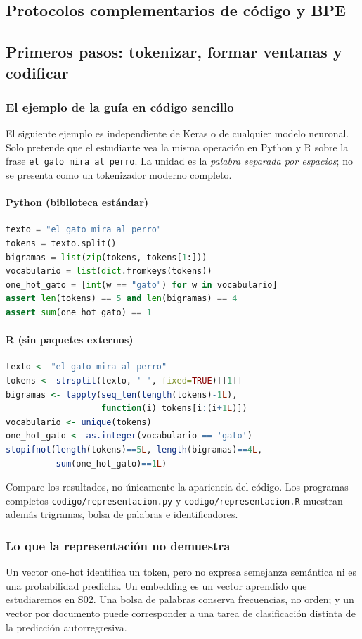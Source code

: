 \subsection{Protocolos complementarios de código y BPE}

\subsection{Primeros pasos: tokenizar, formar ventanas y codificar}
\subsubsection{El ejemplo de la guía en código sencillo}
El siguiente ejemplo es independiente de Keras o de cualquier modelo neuronal. Solo pretende que el estudiante vea la misma operación en Python y R sobre la frase \texttt{el gato mira al perro}. La unidad es la \emph{palabra separada por espacios}; no se presenta como un tokenizador moderno completo.
\paragraph{Python (biblioteca estándar)}
\begin{lstlisting}[language=Python]
texto = "el gato mira al perro"
tokens = texto.split()
bigramas = list(zip(tokens, tokens[1:]))
vocabulario = list(dict.fromkeys(tokens))
one_hot_gato = [int(w == "gato") for w in vocabulario]
assert len(tokens) == 5 and len(bigramas) == 4
assert sum(one_hot_gato) == 1
\end{lstlisting}
\paragraph{R (sin paquetes externos)}
\begin{lstlisting}[language=R]
texto <- "el gato mira al perro"
tokens <- strsplit(texto, ' ', fixed=TRUE)[[1]]
bigramas <- lapply(seq_len(length(tokens)-1L),
                   function(i) tokens[i:(i+1L)])
vocabulario <- unique(tokens)
one_hot_gato <- as.integer(vocabulario == 'gato')
stopifnot(length(tokens)==5L, length(bigramas)==4L,
          sum(one_hot_gato)==1L)
\end{lstlisting}
\noindent Compare los resultados, no únicamente la apariencia del código. Los programas completos \nolinkurl{codigo/representacion.py} y \nolinkurl{codigo/representacion.R} muestran además trigramas, bolsa de palabras e identificadores.
\subsubsection{Lo que la representación no demuestra}
Un vector one-hot identifica un token, pero no expresa semejanza semántica ni es una probabilidad predicha. Un embedding es un vector aprendido que estudiaremos en S02. Una bolsa de palabras conserva frecuencias, no orden; y un vector por documento puede corresponder a una tarea de clasificación distinta de la predicción autorregresiva.
